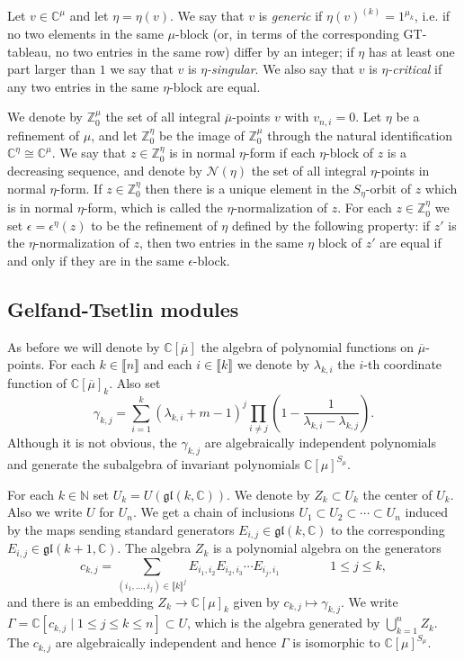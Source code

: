 \documentclass[11pt,fleqn]{article}
\newcommand\NN{\mathbb N}
\newcommand\CC{\mathbb C}
\newcommand\ZZ{\mathbb Z}
\newcommand\N{\mathcal N}
\renewcommand\to{\longrightarrow}
\newcommand\gl{\mathfrak{gl}}
\newcommand\interval[1]{\llbracket #1 \rrbracket}
\begin{document}
Let $v \in \CC^{\mu}$ and let $\eta = \eta(v)$. We say that $v$ is 
\emph{generic} if $\eta(v)^{(k)} = 1^{\mu_k}$, i.e. if no two elements in the 
same $\mu$-block (or, in terms of the corresponding GT-tableau, no two entries 
in the same row) differ by an integer; if $\eta$ has at least one part larger 
than $1$ we say that $v$ is \emph{$\eta$-singular}. We also say that $v$ is 
\emph{$\eta$-critical} if any two entries in the same $\eta$-block are equal.

We denote by $\ZZ^\mu_0$ the set of all integral $\overline \mu$-points $v$ 
with $v_{n,i} = 0$. Let $\eta$ be a refinement of $\mu$, and let $\ZZ^\eta_0$ 
be the image of $\ZZ^\mu_0$ through the natural identification $\CC^\eta \cong 
\CC^\mu$. We say that $z \in \ZZ^\eta_0$ is in normal $\eta$-form if each 
$\eta$-block of $z$ is a decreasing sequence, and denote by $\N(\eta)$ the set
of all integral $\eta$-points in normal $\eta$-form. If $z \in \ZZ_0^\eta$
then there is a unique element in the $S_\eta$-orbit of $z$ which is in normal
$\eta$-form, which is called the $\eta$-normalization of $z$. For each $z \in 
\ZZ_0^\eta$ we set $\epsilon = \epsilon^\eta(z)$ to be the refinement of $\eta$
defined by the following property: if $z'$ is the $\eta$-normalization of $z$,
then two entries in the same $\eta$ block of $z'$ are equal if and only if
they are in the same $\epsilon$-block.



\subsection{Gelfand-Tsetlin modules}
As before we will denote by $\CC[\overline \mu]$ the algebra of polynomial 
functions on $\overline \mu$-points. For each $k \in \interval n$ and each
$i \in \interval k$ we denote by $\lambda_{k,i}$ the $i$-th coordinate 
function of $\CC[\overline \mu]_k$. Also set
\[
  \gamma_{k,j} = \sum_{i = 1}^k (\lambda_{k,i}+m-1)^j 
  \prod_{i \neq j} \left( 1 - \frac{1}{\lambda_{k,i} - \lambda_{k,j}}\right).
\]
Although it is not obvious, the $\gamma_{k,j}$ are algebraically independent 
polynomials and generate the subalgebra of invariant polynomials 
$\CC[\mu]^{S_\mu}$.

For each $k \in \NN$ set $U_k = U(\gl(k, \CC))$. We denote by $Z_k \subset U_k$
the center of $U_k$. Also we write $U$ for $U_n$. We get a chain of inclusions 
$U_1 \subset U_2 \subset \cdots \subset U_n$ induced by the maps sending 
standard generators $E_{i,j} \in \gl(k,\CC)$ to the corresponding $E_{i,j} 
\in \gl(k+1, \CC)$. The algebra $Z_k$ is a polynomial algebra on the generators
\[
  c_{k,j} = \sum_{(i_1, \ldots, i_j) \in \interval{k}^j} 
    E_{i_1,i_2} E_{i_2,i_3} \cdots E_{i_j, i_1} \qquad \qquad 1 \leq j \leq k,
\]
and there is an embedding $Z_k \to \CC[\mu]_k$ given by $c_{k,j} \mapsto 
\gamma_{k,j}$. We write $\Gamma = \CC[c_{k,j} \mid 1 \leq j \leq k \leq n] 
\subset U$, which is the algebra generated by $\bigcup_{k=1}^n Z_k$. The 
$c_{k,j}$ are algebraically independent and hence $\Gamma$ is isomorphic to
$\CC[\mu]^{S_\mu}$.
\end{document}
